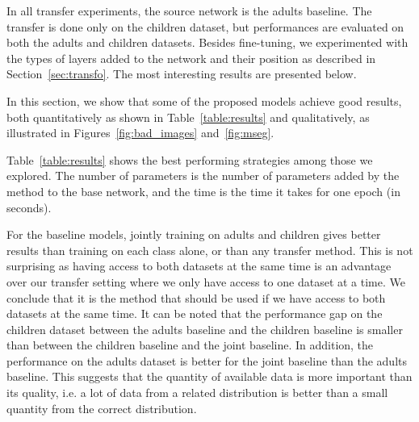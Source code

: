 

In all transfer experiments, the source network is the adults baseline. The transfer is done only on the children dataset, but performances are evaluated on both the adults and children datasets. Besides fine-tuning, we experimented with the types of layers added to the network and their position as described in Section~\ref{sec:transfo}. The most interesting results are presented below.

In this section, we show that some of the proposed models achieve good results, both quantitatively as shown in Table~\ref{table:results} and qualitatively, as illustrated in Figures~\ref{fig:bad_images} and~\ref{fig:mseg}.

Table~\ref{table:results} shows the best performing strategies among those we explored. 
The number of parameters is the number of parameters added by the method to the base network, and the time is the time it takes for one epoch (in seconds).

For the baseline models, jointly training on adults and children gives better results than training on each class alone, or than any transfer method. This is not surprising as having access to both datasets at the same time is an advantage over our transfer setting where we only have access to one dataset at a time. We conclude that it is the method that should be used if we have access to both datasets at the same time. It can be noted that the performance gap on the children dataset between the adults baseline and the children baseline is smaller than between the children baseline and the joint baseline. In addition, the performance on the adults dataset is better for the joint baseline than the adults baseline. This suggests that the quantity of available data is more important than its quality, i.e. a lot of data from a related distribution is better than a small quantity from the correct distribution.

